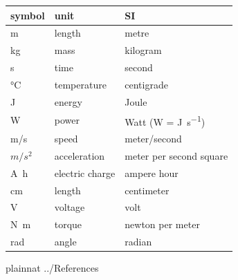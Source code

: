 \documentclass[12pt]{article}
\begin{document}
\renewcommand{\arraystretch}{1.2}
\noindent \begin{tabular}{l l l}
    \toprule
    \textbf{symbol}    & \textbf{unit}   & \textbf{SI}                       \\
    \midrule
    \si{\metre}        & length          & metre                             \\
    \si{\kilogram}     & mass            & kilogram                          \\
    \si{\second}       & time            & second                            \\
    \si{\celsius}      & temperature     & centigrade                        \\
    \si{\joule}        & energy          & Joule                             \\
    \si{\watt}         & power           & Watt (W = \si{\joule\per\second}) \\
    \si{m/s}           & speed           & meter/second                      \\
    $m/s^2$            & acceleration    & meter per second square           \\
    \si{\ampere\hour}  & electric charge & ampere hour                       \\
    cm                 & length          & centimeter                        \\
    \si{\volt}         & voltage         & volt                              \\
    \si{\newton\meter} & torque          & newton per meter                  \\
    \si{\radian}       & angle           & radian                            \\

    \bottomrule
\end{tabular}

\printnoidxglossary[type=\acronymtype,style=mystyle,title=Abbreviations and Acronyms]

\newpage
 {plainnat}
 {../References}
\end{document}
